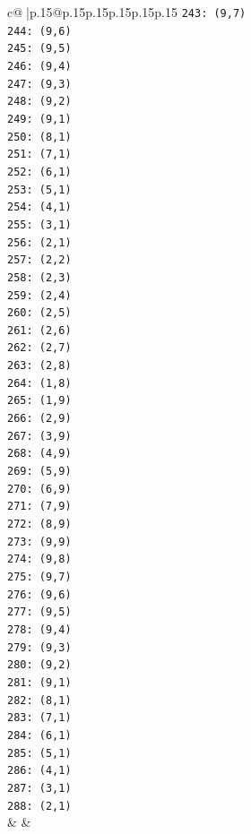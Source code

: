 \documentclass{article}
\begin{document}
{\begin{supertabular}{c@{$\;$}|p{.15\linewidth}@{}p{.15\linewidth}p{.15\linewidth}p{.15\linewidth}p{.15\linewidth}p{.15\linewidth}}
{{{\texttt{243: (9,7)} \\
\texttt{244: (9,6)} \\
\texttt{245: (9,5)} \\
\texttt{246: (9,4)} \\
\texttt{247: (9,3)} \\
\texttt{248: (9,2)} \\
\texttt{249: (9,1)} \\
\texttt{250: (8,1)} \\
\texttt{251: (7,1)} \\
\texttt{252: (6,1)} \\
\texttt{253: (5,1)} \\
\texttt{254: (4,1)} \\
\texttt{255: (3,1)} \\
\texttt{256: (2,1)} \\
\texttt{257: (2,2)} \\
\texttt{258: (2,3)} \\
\texttt{259: (2,4)} \\
\texttt{260: (2,5)} \\
\texttt{261: (2,6)} \\
\texttt{262: (2,7)} \\
\texttt{263: (2,8)} \\
\texttt{264: (1,8)} \\
\texttt{265: (1,9)} \\
\texttt{266: (2,9)} \\
\texttt{267: (3,9)} \\
\texttt{268: (4,9)} \\
\texttt{269: (5,9)} \\
\texttt{270: (6,9)} \\
\texttt{271: (7,9)} \\
\texttt{272: (8,9)} \\
\texttt{273: (9,9)} \\
\texttt{274: (9,8)} \\
\texttt{275: (9,7)} \\
\texttt{276: (9,6)} \\
\texttt{277: (9,5)} \\
\texttt{278: (9,4)} \\
\texttt{279: (9,3)} \\
\texttt{280: (9,2)} \\
\texttt{281: (9,1)} \\
\texttt{282: (8,1)} \\
\texttt{283: (7,1)} \\
\texttt{284: (6,1)} \\
\texttt{285: (5,1)} \\
\texttt{286: (4,1)} \\
\texttt{287: (3,1)} \\
\texttt{288: (2,1)} \\
            }
        }
    }
    & & \\ \\


\end{supertabular}}
\end{document}
